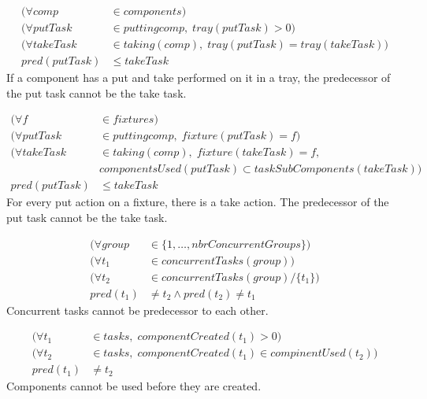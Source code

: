 \documentclass[10pt,a4paper]{report}
\begin{document}
\begin{equation}
\begin{aligned}\label{eq:86}
(\forall comp &\in components) \\
(\forall putTask &\in putting{comp}, \; tray(putTask) > 0) \\
(\forall takeTask &\in taking(comp), \; tray(putTask) = tray(takeTask)) \\
pred(putTask) &\le takeTask
\end{aligned}
\end{equation}
If a component has a put and take performed on it in a tray, the predecessor of the put task cannot be the take task.


\begin{equation}
\begin{aligned}\label{eq:87}
(\forall f &\in fixtures) \\
(\forall putTask &\in putting{comp}, \; fixture(putTask) = f) \\
(\forall takeTask &\in taking(comp), \; fixture(takeTask) = f,\\
&componentsUsed(putTask) \subset taskSubComponents(takeTask))\\
pred(putTask) &\le takeTask
\end{aligned}
\end{equation}
For every put action on a fixture, there is a take action. The predecessor of the put task cannot be the take task.

\begin{equation}
\begin{aligned}\label{eq:88}
(\forall group &\in \{1 , \ldots , nbrConcurrentGroups\}) \\
(\forall t_1 &\in concurrentTasks(group)) \\
(\forall t_2 &\in concurrentTasks(group) / \{t_1\}) \\
pred(t_1) &\neq t_2 \land pred(t_2) \neq t_1
\end{aligned}
\end{equation}
Concurrent tasks cannot be predecessor to each other.

\begin{equation}
\begin{aligned}\label{eq:89}
(\forall t_1 &\in tasks, \; componentCreated(t_1) > 0) \\
(\forall t_2 &\in tasks, \; componentCreated(t_1) \in compinentUsed(t_2)) \\
pred(t_1) &\neq t_2
\end{aligned}
\end{equation}
Components cannot be used before they are created.
\end{document}
